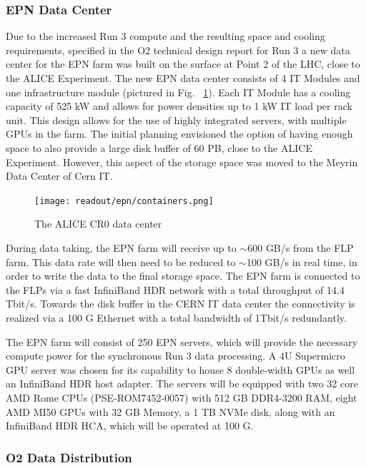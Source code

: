 \subsubsection{EPN Data Center}

Due to the increased Run 3 compute and the resulting space and cooling requirements, specified in the O2 technical design report for Run 3 \cite{Buncic:2011297} a new data center for the EPN farm was built on the surface at Point 2 of the LHC, close to the ALICE Experiment. 
The new EPN data center consists of 4 IT Modules and one infrastructure module (pictured in Fig. ~\ref{fig:containers}). 
Each IT Module has a cooling capacity of 525 kW and allows for power densities up to 1 kW IT load per rack unit. 
This design allows for the use of highly integrated servers, with multiple GPUs in the farm. 
The initial planning envisioned the option of having enough space to also provide a large disk buffer of 60 PB, close to the ALICE Experiment. However, this aspect of the storage space was moved to the Meyrin Data Center of Cern IT.

\begin{figure}[ht]
\centering
\texttt{[image: readout/epn/containers.png]}
\caption{The ALICE CR0 data center}
\label{fig:containers}
\end{figure}

During data taking, the EPN farm will receive up to $\sim$600 GB/s from the FLP farm.
This data rate will then need to be reduced to $\sim$100 GB/s in real time, in order to write the data to the final storage space.
The EPN farm is connected to the FLPs via a fast InfiniBand HDR network with a total throughput of 14.4 Tbit/s. 
Towards the disk buffer in the CERN IT data center the connectivity is realized via a 100 G Ethernet with a total bandwidth of 1Tbit/s redundantly.  

The EPN farm will consist of 250 EPN servers, which will provide the necessary compute power for the synchronous Run 3 data processing. 
A 4U Supermicro GPU server was chosen for its capability to house 8 double-width GPUs as well an InfiniBand HDR host adapter. 
The servers will be equipped with two 32 core AMD Rome CPUs (PSE-ROM7452-0057) with 512 GB DDR4-3200 RAM, eight AMD MI50 GPUs with 32 GB Memory, a 1 TB NVMe disk, along with an InfiniBand HDR HCA, which will be operated at 100 G.

\subsubsection{O2 Data Distribution}

